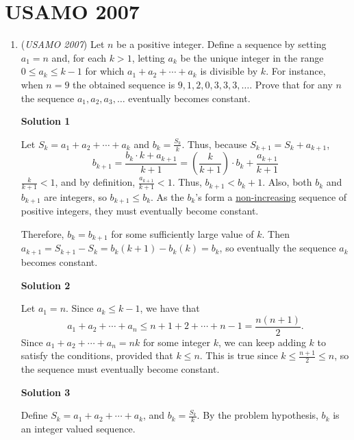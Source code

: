 \section{USAMO 2007}
        \begin{enumerate}
        	\item (\textit{USAMO 2007}) Let $n$ be a positive integer. Define a sequence by setting $a_1=n$ and, for each $k>1$, letting $a_k$ be the unique integer in the range $0\le a_k\le k-1$ for which $a_1+a_2+\cdots+a_k$ is divisible by $k$. For instance, when $n=9$ the obtained sequence is $9, 1, 2, 0, 3, 3, 3, \ldots$.  Prove that for any $n$ the sequence $a_1, a_2, a_3, \ldots$ eventually becomes constant.


 



\textbf{Solution 1}

Let $S_k = a_1 + a_2 + \cdots + a_k$ and $b_k = \frac{S_k}{k}$. Thus, because $S_{k+1} = S_k + a_{k+1}$,
 \[b_{k+1} = \frac{b_k \cdot k + a_{k+1}}{k+1} = \left(\frac{k}{k+1}\right) \cdot b_k + \frac{a_{k+1}}{k+1}\]$\frac{k}{k+1} < 1$, and by definition, $\frac{a_{k+1}}{k+1} < 1$. Thus, $b_{k+1} < b_k + 1$. Also, both $b_k$ and $b_{k+1}$ are integers, so $b_{k+1} \le b_k$. As the $b_k$'s form a \href{https://artofproblemsolving.com/wiki/index.php?title=Non-increasing&action=edit&redlink=1}{non-increasing} sequence of positive integers, they must eventually become constant. 

 Therefore, $b_k = b_{k+1}$ for some sufficiently large value of $k$. Then $a_{k+1} = S_{k+1} - S_k = b_k(k + 1) - b_k(k) = b_k$, so eventually the sequence $a_k$ becomes constant.

 



\textbf{Solution 2}

Let $a_1 = n$. Since $a_k\leq k - 1$, we have that
 \[a_1 + a_2 + \cdots + a_n\leq n + 1 + 2 + \cdots + n - 1 = \frac{n(n + 1)}{2}.\]Since $a_1 + a_2 + \cdots + a_n = nk$ for some integer $k$, we can keep adding $k$ to satisfy the conditions, provided that $k\leq n$. This is true since $k\leq\frac{n + 1}{2}\leq n$, so the sequence must eventually become constant.

 



\textbf{Solution 3}

Define $S_k = a_1 + a_2 + \cdots + a_k$, and $b_k = \frac{S_k}{k}$. By the problem hypothesis, $b_k$ is an integer valued sequence.


\end{enumerate}
